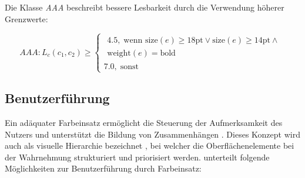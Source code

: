 Die Klasse \emph{AAA} beschreibt bessere Lesbarkeit durch die Verwendung höherer Grenzwerte:

\begin{equation}
  	AAA: L_c(c_1, c_2) \geq
	\begin{cases}
		\begin{split}
	4.5, \; \text{wenn } \text{size}(e) \geq 18\text{pt} \lor \text{size}(e) \geq 14\text{pt} \land\\ \text{weight}(e) = \text{bold}
	\end{split}\\
		7.0,  \;  \text{sonst}
	\end{cases}
\end{equation}

\subsection{Benutzerführung}
\label{sec:usability}
Ein adäquater Farbeinsatz ermöglicht die Steuerung der Aufmerksamkeit des Nutzers und unterstützt die Bildung von Zusammenhängen \citep{webdesign}. Dieses Konzept wird auch als visuelle Hierarchie bezeichnet \citep{visual-hierarchy}, bei welcher die Oberflächenelemente bei der Wahrnehmung strukturiert und priorisiert werden.
\citet{webdesign} unterteilt folgende Möglichkeiten zur Benutzerführung durch Farbeinsatz:

